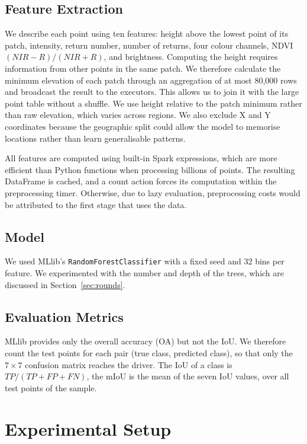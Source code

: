 \documentclass[a4paper, 11pt]{article} %
\begin{document}
\subsection{Feature Extraction}
We describe each point using ten features: height above the lowest point of its patch, intensity, return number, number of returns, four colour channels, NDVI \((NIR-R)/(NIR+R)\), and brightness. Computing the height requires information from other points in the same patch. We therefore calculate the minimum elevation of each patch through an aggregation of at most 80,000 rows and broadcast the result to the executors. This allows us to join it with the large point table without a shuffle. We use height relative to the patch minimum rather than raw elevation, which varies across regions. We also exclude X and Y coordinates because the geographic split could allow the model to memorise locations rather than learn generalisable patterns.

All features are computed using built-in Spark expressions, which are more efficient than Python functions when processing billions of points. The resulting DataFrame is cached, and a count action forces its computation within the preprocessing timer. Otherwise, due to lazy evaluation, preprocessing costs would be attributed to the first stage that uses the data.

\subsection{Model}
We used MLlib's \texttt{RandomForestClassifier} with a fixed seed and 32 bins per feature. We experimented with the number and depth of the trees, which are discussed in Section~\ref{sec:rounds}.

\subsection{Evaluation Metrics}
MLlib provides only the overall accuracy (OA) but not the IoU. We therefore count the test points for each pair (true class, predicted class), so that only the \(7 \times 7\) confusion matrix reaches the driver. The IoU of a class is \(TP/(TP + FP + FN)\), the mIoU is the mean of the seven IoU values, over all test points of the sample.

\section{Experimental Setup}
\label{sec:setup}
\end{document}
